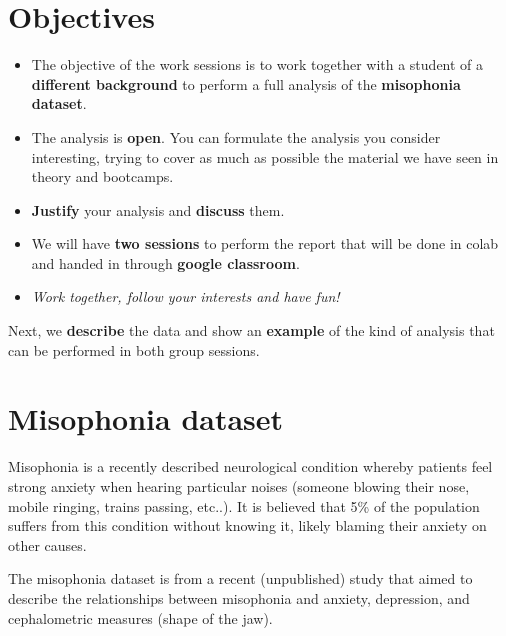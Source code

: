 \documentclass[
]{book}
\begin{document}
\hypertarget{objectives}{%
\section{Objectives}\label{objectives}}

\begin{itemize}
\item
  The objective of the work sessions is to work together with a student of a \textbf{different background} to perform a full analysis of the \textbf{misophonia dataset}.
\item
  The analysis is \textbf{open}. You can formulate the analysis you consider interesting, trying to cover as much as possible the material we have seen in theory and bootcamps.
\item
  \textbf{Justify} your analysis and \textbf{discuss} them.
\item
  We will have \textbf{two sessions} to perform the report that will be done in colab and handed in through \textbf{google classroom}.
\item
  \emph{Work together, follow your interests and have fun!}
\end{itemize}

Next, we \textbf{describe} the data and show an \textbf{example} of the kind of analysis that can be performed in both group sessions.

\hypertarget{misophonia-dataset}{%
\section{Misophonia dataset}\label{misophonia-dataset}}

Misophonia is a recently described neurological condition whereby patients feel strong anxiety when hearing particular noises (someone blowing their nose, mobile ringing, trains passing, etc..). It is believed that 5\% of the population suffers from this condition without knowing it, likely blaming their anxiety on other causes.

The misophonia dataset is from a recent (unpublished) study that aimed to describe the relationships between misophonia and anxiety, depression, and cephalometric measures (shape of the jaw).
\end{document}
